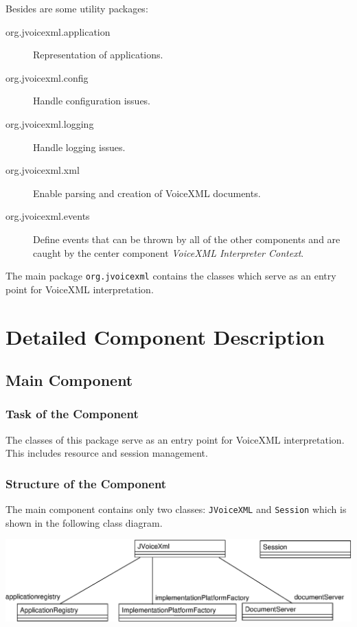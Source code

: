 \documentclass[11pt,a4paper]{article}
\begin{document}
Besides are some utility packages:
\begin{description}
\item[org.jvoicexml.application] Representation of applications.
\item[org.jvoicexml.config] Handle configuration issues.
\item[org.jvoicexml.logging] Handle logging issues.
\item[org.jvoicexml.xml] Enable parsing and creation of VoiceXML documents.
\item[org.jvoicexml.events] Define events that can be thrown by all of the 
other components and are caught by the center component 
\emph{VoiceXML Interpreter Context}.
\end{description}

The main package \texttt{org.jvoicexml} contains the classes which
serve as an entry point for VoiceXML interpretation.

\section{Detailed Component Description}
\label{sec:deta-comp-descr}

\subsection{Main Component}
\label{sec:main-component}

\subsubsection{Task of the Component}

The classes of this package serve as an entry point for VoiceXML
interpretation. This includes resource and session management.

\subsubsection{Structure of the Component}

The main component contains only two classes: \texttt{JVoiceXML} and 
\texttt{Session} which is shown in the following class diagram.

\begin{center}
\includegraphics[scale=0.6]{class-main.eps}
\end{center}
\end{document}
